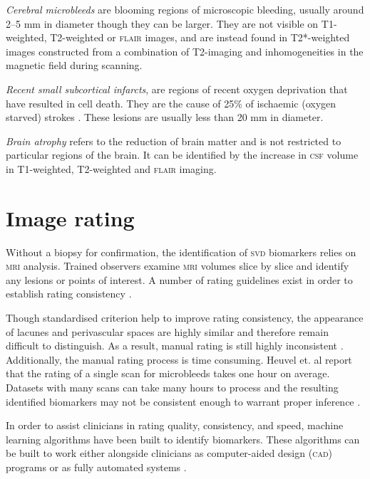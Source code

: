 \textit{Cerebral microbleeds} are blooming regions of microscopic bleeding, usually around 2--5 mm in diameter though they can be larger. They are not visible on T1-weighted, T2-weighted or \textsc{flair} images, and are instead found in T2*-weighted images constructed from a combination of T2-imaging and inhomogeneities in the magnetic field during scanning. 

\textit{Recent small subcortical infarcts}, are regions of recent oxygen deprivation that have resulted in cell death. They are the cause of 25\% of ischaemic (oxygen starved) strokes \cite{WardlawJ.M.2013Nsfr}. These lesions are usually less than 20 mm in diameter. 

\textit{Brain atrophy} refers to the reduction of brain matter and is not restricted to particular regions of the brain. It can be identified by the increase in \textsc{csf} volume in T1-weighted, T2-weighted and \textsc{flair} imaging.

\section{Image rating}\label{svd-rating}

Without a biopsy for confirmation, the identification of \textsc{svd} biomarkers relies on \textsc{mri} analysis. Trained observers examine \textsc{mri} volumes slice by slice and identify any lesions or points of interest. A number of rating guidelines exist in order to establish rating consistency \cite{AdamsH.H.Hieab2013RMfD, PotterGillian2015CPSV, WardlawJ.M.2013Nsfr}.

Though standardised criterion help to improve rating consistency, the appearance of lacunes and perivascular spaces are highly similar and therefore remain difficult to distinguish. As a result, manual rating is still highly inconsistent \cite{PotterGillian2015CPSV}. Additionally, the manual rating process is time consuming. Heuvel et. al \cite{Heuvel2016} report that the rating of a single scan for microbleeds takes one hour on average. Datasets with many scans can take many hours to process and the resulting identified biomarkers may not be consistent enough to warrant proper inference \cite{BenjaminJ.Philip2018LIbN, WardlawJ.M.2013Nsfr}.

In order to assist clinicians in rating quality, consistency, and speed, machine learning algorithms have been built to identify biomarkers. These algorithms can be built to work either alongside clinicians as computer-aided design (\textsc{cad}) programs \cite{Heuvel2016, Uchiyama20071554, Yokoyama2007} or as fully automated systems \cite{DouQ.2016ADoC, GhafoorianM.2017Dml3}.

